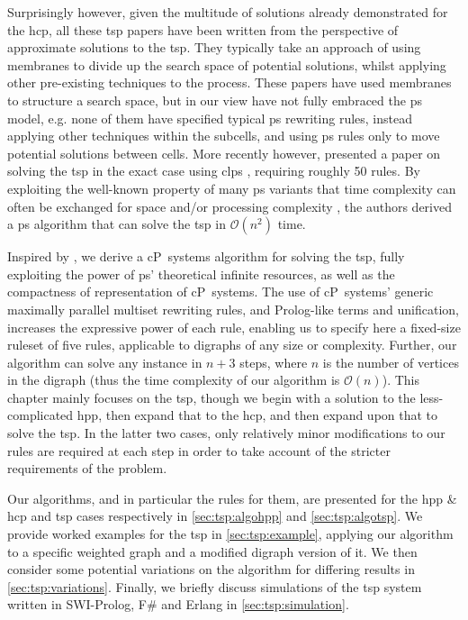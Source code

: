 Surprisingly however, given the multitude of solutions already demonstrated for the \gls{hcp}, all these \gls{tsp} papers have been written from the perspective of approximate solutions to the \gls{tsp}.  They typically take an approach of using membranes to divide up the search space of potential solutions, whilst applying other pre-existing techniques to the process.  These papers have used membranes to structure a search space, but in our view have not fully embraced the \gls{ps} model, e.g. none of them have specified typical \gls{ps} rewriting rules, instead applying other techniques within the subcells, and using \gls{ps} rules only to move potential solutions between cells.  More recently however, \citeauthor{Guo2017} presented a paper on solving the \gls{tsp} in the exact case using \gls{clps} \cite{Guo2017}, requiring roughly 50 rules.  By exploiting the well-known property of many \gls{ps} variants that time complexity can often be exchanged for space and/or processing complexity \cite{Paun1999,Paun2002a,Jimenez2003,Song2017}, the authors derived a \gls{ps} algorithm that can solve the \gls{tsp} in \(\mathcal{O}(n^2)\) time.

Inspired by \cite{Guo2017}, we derive a cP~systems algorithm for solving the \gls{tsp}, fully exploiting the power of \gls{ps}' theoretical infinite resources, as well as the compactness of representation of cP~systems.  The use of cP~systems' generic maximally parallel multiset rewriting rules, and Prolog-like terms and unification, increases the expressive power of each rule, enabling us to specify here a fixed-size ruleset of five rules, applicable to digraphs of any size or complexity.   Further, our algorithm can solve any instance in \(n + 3\) steps, where \(n\) is the number of vertices in the digraph (thus the time complexity of our algorithm is \(\mathcal{O}(n)\)).  This chapter mainly focuses on the \gls{tsp}, though we begin with a solution to the less-complicated \gls{hpp}, then expand that to the \gls{hcp}, and then expand upon that to solve the \gls{tsp}.  In the latter two cases, only relatively minor modifications to our rules are required at each step in order to take account of the stricter requirements of the problem.

Our algorithms, and in particular the rules for them, are presented for the \gls{hpp} \& \gls{hcp} and \gls{tsp} cases respectively in \cref{sec:tsp:algohpp} and \cref{sec:tsp:algotsp}.  We provide worked examples for the \gls{tsp} in \cref{sec:tsp:example}, applying our algorithm to a specific weighted graph and a modified digraph version of it.  We then consider some potential variations on the algorithm for differing results in \cref{sec:tsp:variations}.  Finally, we briefly discuss simulations of the \gls{tsp} system written in SWI-Prolog, F\# and Erlang in \cref{sec:tsp:simulation}.